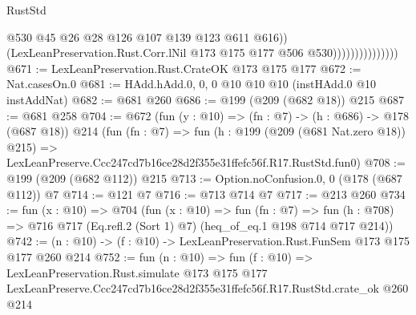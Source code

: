 \begin{lexlean}{RustStd}
\begin{coremodule}
                                    @530
                                    @45
                                    @26
                                    @28
                                    @126
                                    @107
                                    @139
                                    @123
                                    @611
                                    @616))
                                (LexLeanPreservation.Rust.Corr.lNil
                                  @173
                                  @175
                                  @177
                                  @506
                                  @530)))))))))))))))
@671 := LexLeanPreservation.Rust.CrateOK @173 @175 @177
@672 := Nat.casesOn.{0}
@681 := HAdd.hAdd.{0, 0, 0} @10 @10 @10 (instHAdd.{0} @10 instAddNat)
@682 := @681 @260
@686 := @199 (@209 (@682 @18)) @215
@687 := @681 @258
@704 := @672
    (fun (y : @10) => (fn : @7) -> (h : @686) -> @178 (@687 @18))
    @214
    (fun (fn : @7) =>
    fun (h : @199 (@209 (@681 Nat.zero @18)) @215) =>
    LexLeanPreserve.Ccc247cd7b16ce28d2f355e31ffefc56f.R17.RustStd.fun0)
@708 := @199 (@209 (@682 @112)) @215
@713 := Option.noConfusion.{0, 0} (@178 (@687 @112)) @7
@714 := @121 @7
@716 := @713 @714 @7
@717 := @213 @260
@734 := fun (x : @10) =>
  @704
    (fun (x : @10) =>
    fun (fn : @7) =>
    fun (h : @708) => @716 @717 (Eq.refl.{2} (Sort 1) @7) (heq_of_eq.{1} @198 @714 @717 @214))
@742 := (n : @10) -> (f : @10) -> LexLeanPreservation.Rust.FunSem @173 @175 @177 @260 @214
@752 := fun (n : @10) =>
  fun (f : @10) =>
  LexLeanPreservation.Rust.simulate
    @173
    @175
    @177
    LexLeanPreserve.Ccc247cd7b16ce28d2f355e31ffefc56f.R17.RustStd.crate_ok
    @260
    @214
\end{coremodule}
\end{lexlean}

